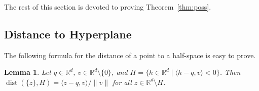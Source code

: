 \documentclass{article}
\newtheorem{lem}[thm]{Lemma}
\DeclareMathOperator{\dist}{dist}
\newcommand{\IR}{\mathbb{R}}
\renewcommand{\leq}{\leqslant}
\begin{document}
The rest of this section is devoted to proving Theorem~\ref{thm:poss}.

\subsection{Distance to Hyperplane}


The following formula for the distance of a point to a half-space is easy to
prove.

\begin{lem}\label{lem:halfspace:distance:formula}
Let $q\in \IR^d$, $v\in \IR^d\setminus\{0\}$, and
$H = \{ h\in\IR^d \mid \langle h - q , v \rangle < 0 \}$.
Then
$\dist(\{z\}, H) = \langle z - q , v\rangle / \lVert v\rVert$
for all $z \in \IR^d \setminus H$.
\end{lem}
%
\end{document}
